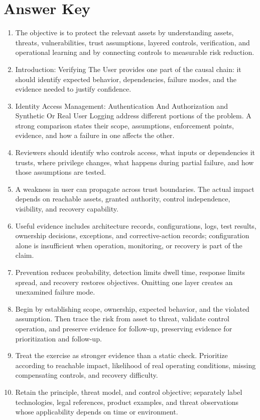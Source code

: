 \documentclass[11pt,letterpaper]{article}
\begin{document}
\section*{Answer Key}
\begin{enumerate}
\item The objective is to protect the relevant assets by understanding assets, threats, vulnerabilities, trust assumptions, layered controls, verification, and operational learning and by connecting controls to measurable risk reduction.
\item Introduction: Verifying The User provides one part of the causal chain: it should identify expected behavior, dependencies, failure modes, and the evidence needed to justify confidence.
\item Identity Access Management: Authentication And Authorization and Synthetic Or Real User Logging address different portions of the problem. A strong comparison states their scope, assumptions, enforcement points, evidence, and how a failure in one affects the other.
\item Reviewers should identify who controls access, what inputs or dependencies it trusts, where privilege changes, what happens during partial failure, and how those assumptions are tested.
\item A weakness in user can propagate across trust boundaries. The actual impact depends on reachable assets, granted authority, control independence, visibility, and recovery capability.
\item Useful evidence includes architecture records, configurations, logs, test results, ownership decisions, exceptions, and corrective-action records; configuration alone is insufficient when operation, monitoring, or recovery is part of the claim.
\item Prevention reduces probability, detection limits dwell time, response limits spread, and recovery restores objectives. Omitting one layer creates an unexamined failure mode.
\item Begin by establishing scope, ownership, expected behavior, and the violated assumption. Then trace the risk from asset to threat, validate control operation, and preserve evidence for follow-up, preserving evidence for prioritization and follow-up.
\item Treat the exercise as stronger evidence than a static check. Prioritize according to reachable impact, likelihood of real operating conditions, missing compensating controls, and recovery difficulty.
\item Retain the principle, threat model, and control objective; separately label technologies, legal references, product examples, and threat observations whose applicability depends on time or environment.
\end{enumerate}
\end{document}

